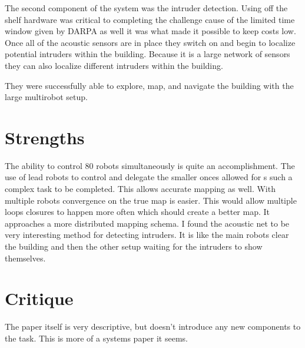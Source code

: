 \documentclass{article}
\begin{document}
The second component of the system was the intruder detection. Using off the shelf hardware was critical to completing the challenge cause of the limited time window given by DARPA as well it was what made it possible to keep costs low. Once all of the acoustic sensors are in place they switch on and begin to localize potential intruders within the building. Because it is a large network of sensors they can also localize different intruders within the building.

They were successfully able to explore, map, and navigate the building with the large multirobot setup.
\section*{Strengths}
The ability to control 80 robots simultaneously is quite an accomplishment. The use of lead robots to control and delegate the smaller onces allowed for s such a complex task to be completed. This allows accurate mapping as well. With multiple robots convergence on the true map is easier. This would allow multiple loops closures to happen more often which should create a better map. It approaches a more distributed mapping schema. I found the acoustic net to be very interesting method for detecting intruders. It is like the main robots clear the building and then the other setup waiting for the intruders to show themselves.
\section*{Critique}
The paper itself is very descriptive, but doesn't introduce any new components to the task. This is more of a systems paper it seems.
\cite{Parker06experimentswith}
\end{document}
